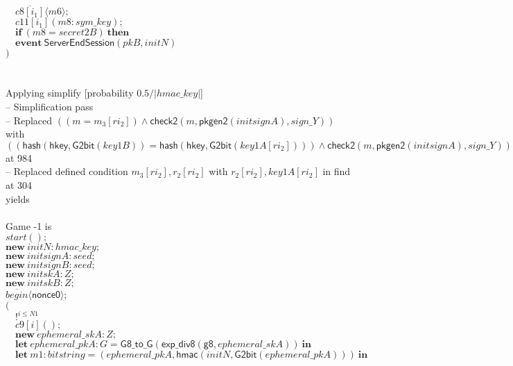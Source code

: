 \documentclass{article}
\newcommand{\cinput}[2]{{#1}({#2})}
\newcommand{\coutput}[2]{\overline{#1}\langle{#2}\rangle}
\newcommand{\kw}[1]{\mathbf{#1}}
\newcommand{\kwf}[1]{\mathsf{#1}}
\newcommand{\var}[1]{\mathit{#1}}
\newcommand{\kwt}[1]{\mathit{#1}}
\newcommand{\kwp}[1]{\mathit{#1}}
\newcommand{\kwc}[1]{\mathit{#1}}
\begin{document}
\begin{tabbing}
\>$\quad \coutput{\kwc{c8}[\var{i}_{1}]}{\var{m6}};$\\
\>$\quad \cinput{\kwc{c11}[\var{i}_{1}]}{\var{m8}: \kwt{sym{\_}key}};$\\
\>$\quad \kw{if}\ (\var{m8}  =  \var{secret2B})\ \kw{then}$\\
\>$\quad \kw{event}\ \kwf{ServerEndSession}(\var{pkB}, \var{initN})$\\
\>$)$\\
\\
\\
Applying simplify {}[probability $0.5 / |\kwt{hmac{\_}key}|${}]{}\\
\quad -- Simplification pass\\
\qquad -- Replaced $((\var{m}  =  \var{m}_{3}[\var{ri}_{2}]) \wedge  \kwf{check2}(\var{m}, \kwf{pkgen2}(\var{initsignA}), \var{sign{\_}Y}))$ with $((\kwf{hash}(\kwf{hkey}, \kwf{G2bit}(\var{key1B}))  =  \kwf{hash}(\kwf{hkey}, \kwf{G2bit}(\var{key1A}[\var{ri}_{2}]))) \wedge  \kwf{check2}(\var{m}, \kwf{pkgen2}(\var{initsignA}), \var{sign{\_}Y}))$ at 984\\
\qquad -- Replaced defined condition $\var{m}_{3}[\var{ri}_{2}], \var{r}_{2}[\var{ri}_{2}]$ with $\var{r}_{2}[\var{ri}_{2}], \var{key1A}[\var{ri}_{2}]$ in find at 304\\
yields\\
\\
Game -1 is\\
\>$\cinput{\kwc{start}}{};$\\
\>$\kw{new}\ \var{initN}: \kwt{hmac{\_}key};$\\
\>$\kw{new}\ \var{initsignA}: \kwt{seed};$\\
\>$\kw{new}\ \var{initsignB}: \kwt{seed};$\\
\>$\kw{new}\ \var{initskA}: \kwt{Z};$\\
\>$\kw{new}\ \var{initskB}: \kwt{Z};$\\
\>$\coutput{\kwc{begin}}{\kwf{nonce0}};$\\
\>$($\\
\>$\quad !^{\var{i} \leq \kwp{N1}}$\\
\>$\quad \cinput{\kwc{c9}[\var{i}]}{};$\\
\>$\quad \kw{new}\ \var{ephemeral{\_}skA}: \kwt{Z};$\\
\>$\quad \kw{let}\ \var{ephemeral{\_}pkA}: \kwt{G} = \kwf{G8{\_}to{\_}G}(\kwf{exp{\_}div8}(\kwf{g8}, \var{ephemeral{\_}skA}))\ \kw{in}$\\
\>$\quad \kw{let}\ \var{m1}: \kwt{bitstring} = \kwf{}(\var{ephemeral{\_}pkA}, \kwf{hmac}(\var{initN}, \kwf{G2bit}(\var{ephemeral{\_}pkA})))\ \kw{in}$\\

\end{tabbing}
\end{document}
